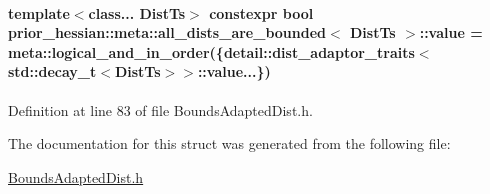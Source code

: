 \paragraph[{\texorpdfstring{value}{value}}]{\setlength{\rightskip}{0pt plus 5cm}template$<$class... Dist\+Ts$>$ constexpr bool {\bf prior\+\_\+hessian\+::meta\+::all\+\_\+dists\+\_\+are\+\_\+bounded}$<$ Dist\+Ts $>$\+::value = {\bf meta\+::logical\+\_\+and\+\_\+in\+\_\+order}(\{{\bf detail\+::dist\+\_\+adaptor\+\_\+traits}$<$std\+::decay\+\_\+t$<$Dist\+Ts$>$$>$\+::value...\})\hspace{0.3cm}{\ttfamily [static]}}\hypertarget{structprior__hessian_1_1meta_1_1all__dists__are__bounded_a2fc2479323836d75b65614a3ee2b640f}{}\label{structprior__hessian_1_1meta_1_1all__dists__are__bounded_a2fc2479323836d75b65614a3ee2b640f}


Definition at line 83 of file Bounds\+Adapted\+Dist.\+h.



The documentation for this struct was generated from the following file\+:\begin{DoxyCompactItemize}
\item 
\hyperlink{BoundsAdaptedDist_8h}{Bounds\+Adapted\+Dist.\+h}\end{DoxyCompactItemize}
